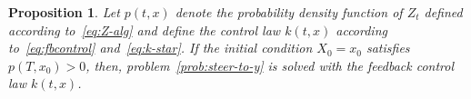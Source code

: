 \documentclass[letterpaper, 10 pt, conference]{ieeeconf}  %
\newcommand{\at}[1]{{\color{blue} #1}}
\newtheorem{proposition}{Proposition}
\begin{document}
\begin{proposition}\label{prop:sol2p1}
Let $p(t,x)$ denote the probability density function  of $Z_t$ defined according to~\eqref{eq:Z-alg} and define the control law $k(t,x)$ according to~\eqref{eq:fbcontrol} and~\eqref{eq:k-star}. If the initial condition $X_0=x_0$ satisfies $p(T,x_0)>0$, then, problem~\ref{prob:steer-to-y} is solved with the feedback control law $k(t,x)$. 
\end{proposition}
\end{document}
